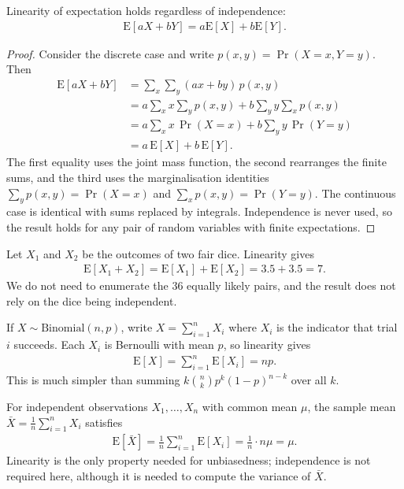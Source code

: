 \documentclass[a4paper, 12pt]{book}
\begin{document}
\begin{proposition}
    Linearity of expectation holds regardless of independence:
    \begin{align}
        \mathrm{E}[aX + bY] = a\mathrm{E}[X] + b\mathrm{E}[Y].
    \end{align}
\end{proposition}
\begin{proof}
    Consider the discrete case and write $p(x,y)=\Pr(X=x,Y=y)$. Then
    \begin{align}
        \mathrm{E}[aX+bY]
        &= \sum_x\sum_y (ax+by)\,p(x,y)\\
        &= a\sum_x x\sum_y p(x,y) + b\sum_y y\sum_x p(x,y)\\
        &= a\sum_x x\,\Pr(X=x) + b\sum_y y\,\Pr(Y=y)\\
        &= a\,\mathrm{E}[X] + b\,\mathrm{E}[Y].
    \end{align}
    The first equality uses the joint mass function, the second rearranges the
    finite sums, and the third uses the marginalisation identities
    $\sum_y p(x,y)=\Pr(X=x)$ and $\sum_x p(x,y)=\Pr(Y=y)$. The continuous case is
    identical with sums replaced by integrals. Independence is never used, so the
    result holds for any pair of random variables with finite expectations.
\end{proof}
\begin{example}
    Let $X_1$ and $X_2$ be the outcomes of two fair dice. Linearity gives
    \begin{align}
        \mathrm{E}[X_1+X_2] = \mathrm{E}[X_1]+\mathrm{E}[X_2]
        = 3.5+3.5 = 7.
    \end{align}
    We do not need to enumerate the $36$ equally likely pairs, and the result
    does not rely on the dice being independent.
\end{example}

\begin{example}
    If $X\sim\mathrm{Binomial}(n,p)$, write $X=\sum_{i=1}^n X_i$ where $X_i$ is
    the indicator that trial $i$ succeeds. Each $X_i$ is Bernoulli with mean $p$,
    so linearity gives
    \begin{align}
        \mathrm{E}[X] = \sum_{i=1}^n \mathrm{E}[X_i] = np.
    \end{align}
    This is much simpler than summing $k\binom{n}{k}p^k(1-p)^{n-k}$ over all $k$.
\end{example}

\begin{example}
    For independent observations $X_1,\ldots,X_n$ with common mean $\mu$, the
    sample mean $\bar X = \frac1n\sum_{i=1}^n X_i$ satisfies
    \begin{align}
        \mathrm{E}[\bar X]
        = \frac1n\sum_{i=1}^n \mathrm{E}[X_i]
        = \frac1n\cdot n\mu = \mu.
    \end{align}
    Linearity is the only property needed for unbiasedness; independence is not
    required here, although it is needed to compute the variance of $\bar X$.
\end{example}
\end{document}
